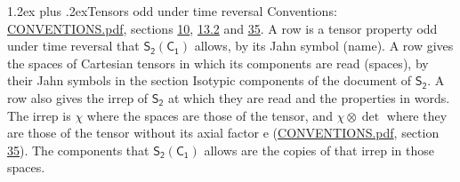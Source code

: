 \documentclass[10pt,a4paper]{article}
\makeatletter
\renewcommand\section{\@startsection{section}{1}{\z@}{-3ex plus -1ex minus -.2ex}%
  {1.2ex plus .2ex}{\normalfont\large\sffamily\bfseries\color{parttitle}}}
\numberwithin{equation}{section}
\newcommand{\grp}[1]{\mathsf{#1}}
\newcommand{\irrprod}{\otimes}
\makeatother
\begin{document}
\section{Tensors odd under time reversal}\label{s:time_odd}
Conventions: \href{../../CONVENTIONS.pdf}{CONVENTIONS.pdf}, sections \href{../../../rotation/CONVENTIONS.pdf\#conv.10}{10}, \href{../../../rotation/CONVENTIONS.pdf\#conv.13.2}{13.2} and \href{../../CONVENTIONS.pdf\#conv.35}{35}.
\leavevmode\label{n:head.name.property}A row is a tensor property odd under time reversal that $\grp{S_{2}}(\grp{C_{1}})$ allows, by its Jahn symbol (name). \label{n:head.spaces}A row gives the spaces of Cartesian tensors in which its components are read (spaces), by their Jahn symbols in the section Isotypic components of the document of \href{../../../rotation/data/pdf/S2.pdf}{$\grp{S_{2}}$}. \label{n:head.properties}A row also gives the irrep of $\grp{S_{2}}$ at which they are read and the properties in words. The irrep is $\chi$ where the spaces are those of the tensor, and $\chi \irrprod \det$ where they are those of the tensor without its axial factor e (\href{../../CONVENTIONS.pdf}{CONVENTIONS.pdf}, section \href{../../CONVENTIONS.pdf\#conv.35}{35}). The components that $\grp{S_{2}}(\grp{C_{1}})$ allows are the copies of that irrep in those spaces.
\end{document}
